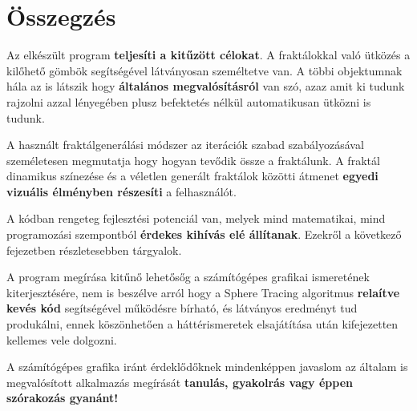 \chapter{Összegzés} %
\label{ch:sum}

Az elkészült program \textbf{teljesíti a kitűzött célokat}. A fraktálokkal való ütközés a kilőhető gömbök segítségével látványosan személtetve van. A többi objektumnak hála az is látszik hogy \textbf{általános megvalósításról} van szó, azaz amit ki tudunk rajzolni azzal lényegében plusz befektetés nélkül automatikusan ütközni is tudunk. 

A használt fraktálgenerálási módszer az iterációk szabad szabályozásával személetesen megmutatja hogy hogyan tevődik össze a fraktálunk. A fraktál dinamikus színezése és a véletlen generált fraktálok közötti átmenet \textbf{egyedi vizuális élményben részesíti} a felhasználót.

A kódban rengeteg fejlesztési potenciál van, melyek mind matematikai, mind programozási szempontból\textbf{ érdekes kihívás elé állítanak}. Ezekről a következő fejezetben részletesebben tárgyalok.

A program megírása kitűnő lehetősőg a számítógépes grafikai ismeretének kiterjesztésére, nem is beszélve arról hogy a Sphere Tracing algoritmus \textbf{relaítve kevés kód} segítségével működésre bírható, és látványos eredményt tud produkálni, ennek köszönhetően a háttérismeretek elsajátítása után kifejezetten kellemes vele dolgozni. 

A számítógépes grafika iránt érdeklődőknek mindenképpen javaslom az általam is megvalósított alkalmazás megírását \textbf{tanulás, gyakolrás vagy éppen szórakozás gyanánt!}